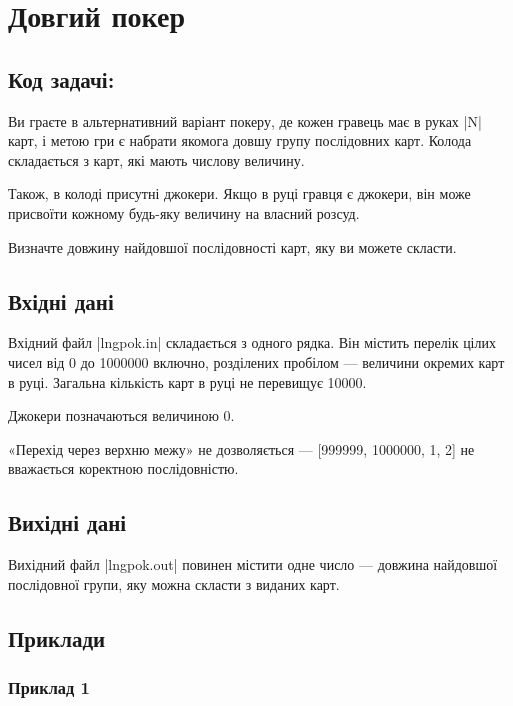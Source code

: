 \documentclass[12pt,a4paper]{article}
\begin{document}
\section*{Довгий покер \hfill {}}


\subsection*{Код задачі: }

Ви граєте в альтернативний варіант покеру, де кожен гравець має в руках |N| карт, і метою гри є набрати якомога довшу групу послідовних карт.
Колода складається з карт, які мають числову величину.

Також, в колоді присутні джокери.
Якщо в руці гравця є джокери, він може присвоїти кожному будь-яку величину на власний розсуд.

Визначте довжину найдовшої послідовності карт, яку ви можете скласти.

\subsection*{Вхідні дані}

Вхідний файл |lngpok.in| складається з одного рядка.
Він містить перелік цілих чисел від 0 до 1000000 включно, розділених пробілом --- величини окремих карт в руці.
Загальна кількість карт в руці не перевищує 10000.

Джокери позначаються величиною 0.

«Перехід через верхню межу» не дозволяється --- [999999, 1000000, 1, 2] не вважається коректною послідовністю.


\subsection*{Вихідні дані}

Вихідний файл |lngpok.out| повинен містити одне число --- довжина найдовшої послідовної групи, яку можна скласти з виданих карт.


\pagebreak


\subsection*{Приклади}

\subsubsection*{Приклад 1}
\end{document}
